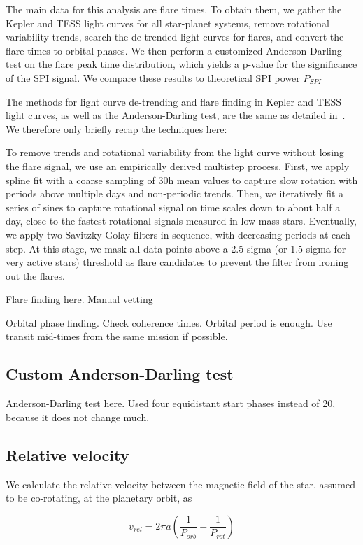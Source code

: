 \documentclass[twocolumn]{aastex631}
\begin{document}
The main data for this analysis are flare times. To obtain them, we gather the Kepler and TESS light curves for all star-planet systems, remove rotational variability trends, search the de-trended light curves for flares, and convert the flare times to orbital phases. We then perform a customized Anderson-Darling test on the flare peak time distribution, which yields a p-value for the significance of the SPI signal. We compare these results to theoretical SPI power $P_{SPI}$

The methods for light curve de-trending and flare finding in Kepler and TESS light curves, as well as the Anderson-Darling test, are the same as detailed in~\citep{ilin2022searching}. We therefore only briefly recap the techniques here:

To remove trends and rotational variability from the light curve without losing the flare signal, we use an empirically derived multistep process. First, we apply spline fit with a coarse sampling of 30h mean values to capture slow rotation with periods above multiple days and non-periodic trends. Then, we iteratively fit a series of sines to capture rotational signal on time scales down to about half a day, close to the fastest rotational signals measured in low mass stars. Eventually, we apply two Savitzky-Golay filters in sequence, with decreasing periods at each step. At this stage, we mask all data points above a 2.5 sigma (or 1.5 sigma for very active stars) threshold as flare candidates to prevent the filter from ironing out the flares.

Flare finding here. Manual vetting

Orbital phase finding. Check coherence times. Orbital period is enough.
Use transit mid-times from the same mission if possible.
\subsection{Custom Anderson-Darling test}
Anderson-Darling test here. Used four equidistant start phases instead of 20, because it does not change much.


\subsection{Relative velocity}

We calculate the relative velocity between the magnetic field of the star, assumed to be co-rotating, at the planetary orbit, as

\begin{equation}
    v_{rel} = 2 \pi a \left(\dfrac{1}{P_{orb}} - \dfrac{1}{P_{rot}}\right) 
\end{equation}
\end{document}
